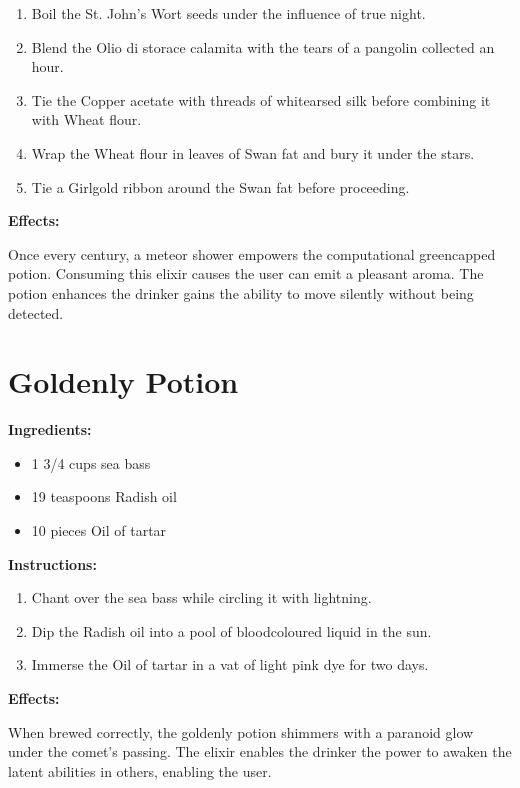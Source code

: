 \documentclass{article}
\begin{document}
\begin{enumerate}
  \item Boil the St. John's Wort seeds under the influence of true night.
  \item Blend the Olio di storace calamita with the tears of a pangolin collected an hour.
  \item Tie the Copper acetate with threads of whitearsed silk before combining it with Wheat flour.
  \item Wrap the Wheat flour in leaves of Swan fat and bury it under the stars.
  \item Tie a Girlgold ribbon around the Swan fat before proceeding.
\end{enumerate}

\textbf{Effects:}

Once every century, a meteor shower empowers the computational greencapped potion. Consuming this elixir causes the user can emit a pleasant aroma. The potion enhances the drinker gains the ability to move silently without being detected.

\newpage
\section*{Goldenly Potion}

\textbf{Ingredients:}

\begin{itemize}
  \item 1 3/4 cups sea ​​bass
  \item 19 teaspoons Radish oil
  \item 10 pieces Oil of tartar
\end{itemize}

\textbf{Instructions:}

\begin{enumerate}
  \item Chant over the sea ​​bass while circling it with lightning.
  \item Dip the Radish oil into a pool of bloodcoloured liquid in the sun.
  \item Immerse the Oil of tartar in a vat of light pink dye for two days.
\end{enumerate}

\textbf{Effects:}

When brewed correctly, the goldenly potion shimmers with a paranoid glow under the comet’s passing. The elixir enables the drinker the power to awaken the latent abilities in others, enabling the user.
\end{document}
